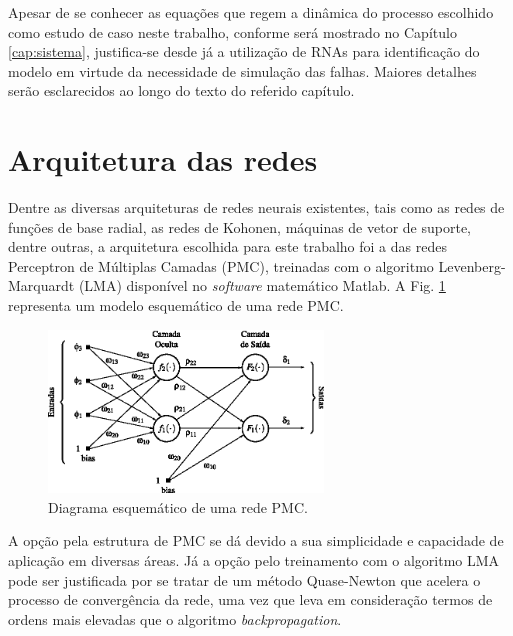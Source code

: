 Apesar de se conhecer as equações que regem a dinâmica do processo escolhido
como estudo de caso neste trabalho, conforme será mostrado no Capítulo
\ref{cap:sistema}, justifica-se desde já a utilização de RNAs para identificação
do modelo em virtude da necessidade de simulação das falhas. Maiores detalhes
serão esclarecidos ao longo do texto do referido capítulo.

\section{Arquitetura das redes}
Dentre as diversas arquiteturas de redes neurais existentes, tais como as redes
de funções de base radial, as redes de Kohonen, máquinas de vetor de suporte,
dentre outras, a arquitetura escolhida para este trabalho foi a das redes
Perceptron de Múltiplas Camadas (PMC), treinadas com o algoritmo
Levenberg-Marquardt (LMA) disponível no {\it software} matemático Matlab\reg. A
Fig. \ref{fig:pmc} representa um modelo esquemático de uma rede PMC.

\begin{figure}[htb]
\centering
    \includegraphics[width=0.65\textwidth]{imgs/rnas/eps/pmc}
    \caption{Diagrama esquemático de uma rede PMC.}
    \label{fig:pmc}
\end{figure}


A opção pela estrutura de PMC se dá devido a sua simplicidade e capacidade de
aplicação em diversas áreas. Já a opção pelo treinamento com o algoritmo LMA
pode ser justificada por se tratar de um método Quase-Newton que acelera o
processo de convergência da rede, uma vez que leva em consideração termos de
ordens mais elevadas que o algoritmo {\it backpropagation}. 

